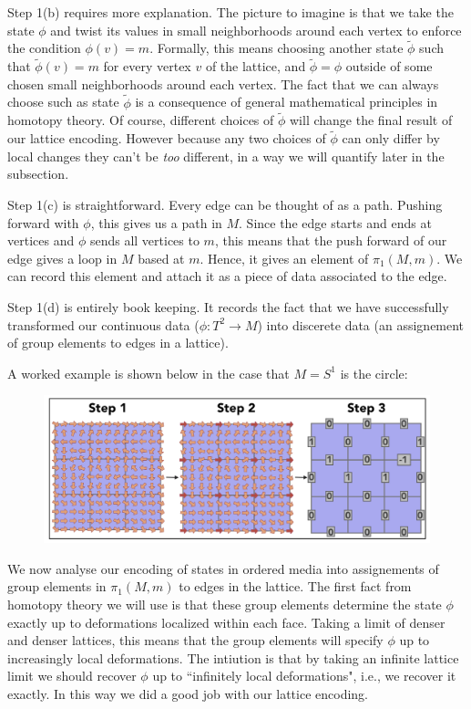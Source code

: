 \documentclass{article}
\theoremstyle{definition}
\numberwithin{figure}{section}
\begin{document}
Step 1(b) requires more explanation. The picture to imagine is that we take the state $\phi$ and twist its values in small neighborhoods around each vertex to enforce the condition $\phi(v)=m$. Formally, this means choosing another state $\tilde{\phi}$ such that $\tilde{\phi}(v)=m$ for every vertex $v$ of the lattice, and $\tilde{\phi}=\phi$ outside of some chosen small neighborhoods around each vertex. The fact that we can always choose such as state $\tilde{\phi}$ is a consequence of general mathematical principles in homotopy theory. Of course, different choices of $\tilde{\phi}$ will change the final result of our lattice encoding. However because any two choices of $\tilde{\phi}$ can only differ by local changes they can't be \textit{too} different, in a way we will quantify later in the subsection.

Step 1(c) is straightforward. Every edge can be thought of as a path. Pushing forward with $\phi$, this gives us a path in $M$. Since the edge starts and ends at vertices and $\phi$ sends all vertices to $m$, this means that the push forward of our edge gives a loop in $M$ based at $m$. Hence, it gives an element of $\pi_1(M,m)$. We can record this element and attach it as a piece of data associated to the edge.

Step 1(d) is entirely book keeping. It records the fact that we have successfully transformed our continuous data ($\phi:T^2\to M$) into discerete data (an assignement of group elements to edges in a lattice).

A worked example is shown below in the case that $M=S^1$ is the circle:

\begin{figure}[h]
\begin{center}
\includegraphics[scale=.3]{full-example}
\end{center}
\end{figure}

We now analyse our encoding of states in ordered media into assignements of group elements in $\pi_1(M,m)$ to edges in the lattice. The first fact from homotopy theory we will use is that these group elements determine the state $\phi$ exactly up to deformations localized within each face. Taking a limit of denser and denser lattices, this means that the group elements will specify $\phi$ up to increasingly local deformations. The intiution is that by taking an infinite lattice limit we should recover $\phi$ up to ``infinitely local deformations", i.e., we recover it exactly. In this way we did a good job with our lattice encoding.
\end{document}
